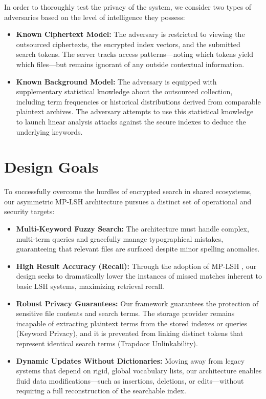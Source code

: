 In order to thoroughly test the privacy of the system, we consider two types of adversaries based on the level of intelligence they possess:%
\begin{itemize}
    \item \textbf{Known Ciphertext Model:} The adversary is restricted to viewing the outsourced ciphertexts, the encrypted index vectors, and the submitted search tokens.%
    The server tracks access patterns---noting which tokens yield which files---but remains ignorant of any outside contextual information.%
    \item \textbf{Known Background Model:} The adversary is equipped with supplementary statistical knowledge about the outsourced collection, including term frequencies or historical distributions derived from comparable plaintext archives.%
    The adversary attempts to use this statistical knowledge to launch linear analysis attacks against the secure indexes to deduce the underlying keywords.%
\end{itemize}

\section{Design Goals}
To successfully overcome the hurdles of encrypted search in shared ecosystems, our asymmetric MP-LSH architecture pursues a distinct set of operational and security targets:%
\begin{itemize}
    \item \textbf{Multi-Keyword Fuzzy Search:} The architecture must handle complex, multi-term queries and gracefully manage typographical mistakes, guaranteeing that relevant files are surfaced despite minor spelling anomalies.%
    \item \textbf{High Result Accuracy (Recall):} Through the adoption of MP-LSH \cite{lv2007multi}, our design seeks to dramatically lower the instances of missed matches inherent to basic LSH systems, maximizing retrieval recall.%
    \item \textbf{Robust Privacy Guarantees:} Our framework guarantees the protection of sensitive file contents and search terms.%
    The storage provider remains incapable of extracting plaintext terms from the stored indexes or queries (Keyword Privacy), and it is prevented from linking distinct tokens that represent identical search terms (Trapdoor Unlinkability).%
    \item \textbf{Dynamic Updates Without Dictionaries:} Moving away from legacy systems that depend on rigid, global vocabulary lists, our architecture enables fluid data modifications---such as insertions, deletions, or edits---without requiring a full reconstruction of the searchable index.%
\end{itemize}